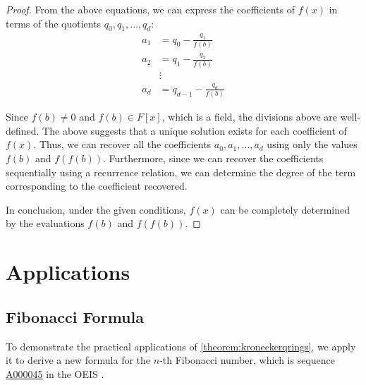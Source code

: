 \documentclass[12pt,reqno]{article}
\theoremstyle{plain}
\theoremstyle{definition}
\newcommand{\seqnum}[1]{\href{https://oeis.org/#1}{\rm \underline{#1}}}
\begin{document}
\begin{proof}
From the above equations, we can express the coefficients of $f(x)$ in terms of the quotients $q_0, q_1, \ldots, q_d$:
\begin{align*}
a_1 &= q_0 - \frac{q_1}{f(b)} \\
a_2 &= q_1 - \frac{q_2}{f(b)} \\
&\vdots \\
a_d &= q_{d-1} - \frac{q_d}{f(b)}
\end{align*}

Since $f(b) \neq 0$ and $f(b) \in F[x]$, which is a field, the divisions above are well-defined. The above suggests that a unique solution exists for each coefficient of $f(x)$. Thus, we can recover all the coefficients $a_0, a_1, \ldots, a_d$ using only the values $f(b)$ and $f(f(b))$. Furthermore, since we can recover the coefficients sequentially using a recurrence relation, we can determine the degree of the term corresponding to the coefficient recovered.

In conclusion, under the given conditions, $f(x)$ can be completely determined by the evaluations $f(b)$ and $f(f(b))$.
\end{proof}

\section{Applications} \label{section:applications}

\subsection{Fibonacci Formula}
To demonstrate the practical applications of \cref{theorem:kroneckerqrings}, we apply it to derive a new formula for the $n$-th Fibonacci number, which is sequence \seqnum{A000045} in the OEIS \cite{A000045}.
\end{document}
